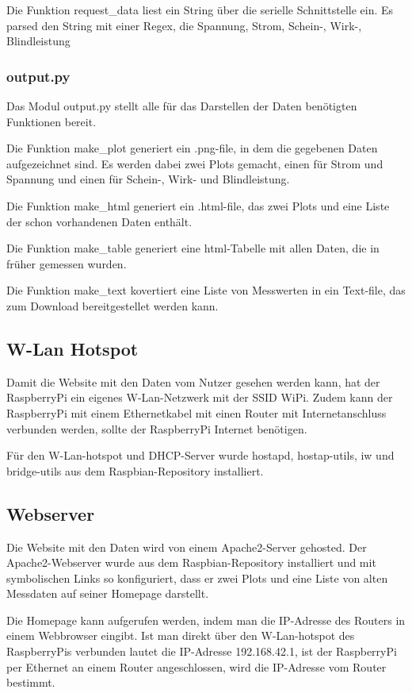 \documentclass{article}
\begin{document}
Die Funktion request\_data liest ein String über die serielle Schnittstelle ein.
Es parsed den String mit einer Regex, die Spannung, Strom, Schein-, Wirk-, Blindleistung 

\subsubsection{output.py}
Das Modul output.py stellt alle für das Darstellen der Daten benötigten Funktionen bereit.

Die Funktion make\_plot generiert ein .png-file, in dem die gegebenen Daten aufgezeichnet sind.
Es werden dabei zwei Plots gemacht, einen für Strom und Spannung und einen für Schein-, Wirk- und Blindleistung.

Die Funktion make\_html generiert ein .html-file, das zwei Plots und eine Liste der schon vorhandenen Daten enthält.

Die Funktion make\_table generiert eine html-Tabelle mit allen Daten, die in früher gemessen wurden.

Die Funktion make\_text kovertiert eine Liste von Messwerten in ein Text-file, das zum Download bereitgestellet werden kann.

\subsection{W-Lan Hotspot}
Damit die Website mit den Daten vom Nutzer gesehen werden kann, hat der RaspberryPi ein eigenes W-Lan-Netzwerk mit der SSID WiPi.
Zudem kann der RaspberryPi mit einem Ethernetkabel mit einen Router mit Internetanschluss verbunden werden, sollte der RaspberryPi Internet benötigen.

Für den W-Lan-hotspot und DHCP-Server wurde hostapd, hostap-utils, iw und bridge-utils aus dem Raspbian-Repository installiert.

\subsection{Webserver}
Die Website mit den Daten wird von einem Apache2-Server gehosted.
Der Apache2-Webserver wurde aus dem Raspbian-Repository installiert und mit symbolischen Links so konfiguriert, dass er zwei Plots und eine Liste von alten Messdaten auf seiner Homepage darstellt.

Die Homepage kann aufgerufen werden, indem man die IP-Adresse des Routers in einem Webbrowser eingibt.
Ist man direkt über den W-Lan-hotspot des RaspberryPis verbunden lautet die IP-Adresse 192.168.42.1, ist der RaspberryPi per Ethernet an einem Router angeschlossen, wird die IP-Adresse vom Router bestimmt.
\end{document}
